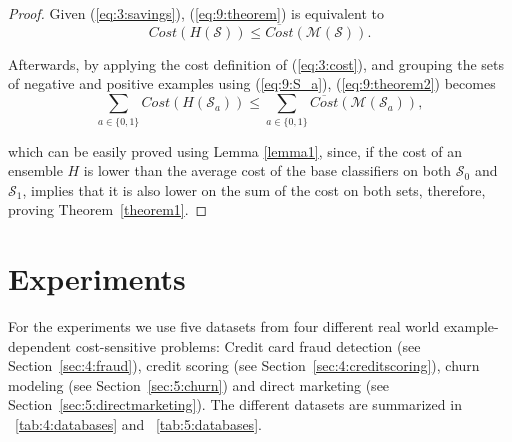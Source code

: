 {  \begin{proof}
  Given (\ref{eq:3:savings}), (\ref{eq:9:theorem}) is equivalent to
  \begin{equation}\label{eq:9:theorem2}
    Cost(H(\mathcal{S})) \le \overline{Cost} (\mathcal{M}(\mathcal{S})). 
  \end{equation}

  \noindent Afterwards, by applying the cost definition of (\ref{eq:3:cost}), and grouping the 
  sets of negative and positive examples using (\ref{eq:9:S_a}), (\ref{eq:9:theorem2}) becomes
  \begin{equation}
    \sum_{a\in \{0,1\}} Cost(H(\mathcal{S}_a)) \le \sum_{a\in \{0,1\}} \overline{Cost} (\mathcal{M} 
    (\mathcal{S}_a)),
  \end{equation}
  
  \noindent which can be easily proved using Lemma \ref{lemma1}, since, if the cost of an ensemble 
  $H$ is  lower than the average cost of the base classifiers on both $\mathcal{S}_0$ and 
  $\mathcal{S}_1$,  implies that it is also lower on the sum of the cost on both sets, 
  therefore, proving Theorem~\ref{theorem1}.
  \end{proof}
 
\section{Experiments}
\label{sec:9:experiments}

For the experiments we use five datasets from four different real world example-dependent 
cost-sensitive problems: Credit card fraud detection (see Section~\ref{sec:4:fraud}), credit 
scoring (see Section~\ref{sec:4:creditscoring}), churn modeling (see Section~\ref{sec:5:churn}) and 
direct marketing (see Section~\ref{sec:5:directmarketing}). The different datasets are summarized 
in \tablename{~\ref{tab:4:databases}} and \tablename{~\ref{tab:5:databases}}.

}
